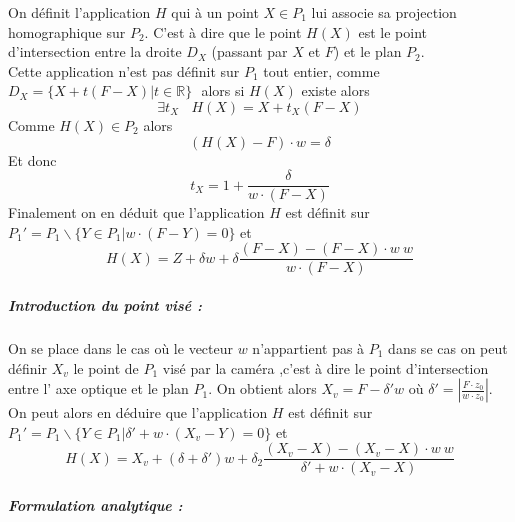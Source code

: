 On définit l'application $H$ qui à un point $X\in P_{1}$ lui associe sa projection homographique sur $P_{2}$. C'est à dire que le point $H(X)$ est le point d'intersection entre la droite $D_{X}$ (passant par $X$ et $F$) et le plan $P_{2}$.\\
Cette application n'est pas définit sur $P_{1}$ tout entier, comme $D_{X}=\{X+t(F-X)|t\in\mathbb{R}\}~~~$alors si $H(X)$ existe alors 
\begin{equation*}
\exists t_{X}~~~~H(X)=X+t_{X}(F-X)
\end{equation*}
Comme $H(X)\in P_{2}$ alors
\begin{equation*}
(H(X)-F)\cdot w =\delta
\end{equation*}
Et donc 
\begin{equation*}
t_{X}=1+\frac{\delta}{w\cdot(F-X)}
\end{equation*}
Finalement on en déduit que l'application $H$ est définit sur $P_{1}'=P_{1}\backslash \{Y\in P_{1}|w\cdot(F-Y)=0\}$ et 
\begin{equation*}
H(X)=Z+\delta w+\delta \frac{(F-X)-(F-X)\cdot w~ w}{w\cdot (F-X)}
\end{equation*}

\subparagraph{Introduction du point visé :}
On se place dans le cas où le vecteur $w$ n'appartient pas à $P_{1}$ dans se cas on peut définir $X_{v}$ le point de $P_{1}$ visé par la caméra ,c'est à dire le point d'intersection entre l' axe optique et le plan $P_{1}$. On obtient alors $X_{v}=F-\delta'w$ où $\delta'=\left|\frac{F \cdot z_{0}}{w\cdot z_{0}} \right|$.\\


On peut alors en déduire que l'application $H$ est définit sur $P_{1}'=P_{1}\backslash \{Y\in P_{1}|\delta'+w\cdot(X_{v}-Y)=0\}$ et 
\begin{equation*}
H(X)=X_{v}+(\delta+\delta')w+\delta_{2}\frac{(X_{v}-X)-(X_{v}-X)\cdot w~ w}{\delta'+w\cdot (X_{v}-X)}
\end{equation*}



\subparagraph{Formulation analytique :}\\


